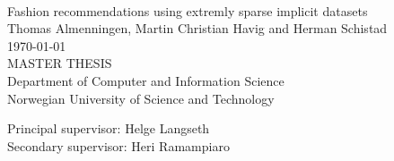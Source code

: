 \documentclass[10pt,a4paper,oneside]{report}
\def \thesistitle{Fashion recommendations using extremly sparse implicit datasets}
\def \authorname{Thomas Almenningen, Martin Christian Havig and Herman Schistad}
\def \supheri{Heri Ramampiaro}
\def \suphelge{Helge Langseth}
\begin{document}

\begin{titlepage}
\begin{center}
\mbox{}\\[6pc]
\begin{center}
\Huge{\thesistitle}\\[2pc]

\Large{\authorname}\\[1pc]
\large{\today}\\[2pc]

MASTER THESIS\\
Department of Computer and Information Science\\
Norwegian University of Science and Technology
\end{center}
\vfill

\noindent Principal supervisor: \suphelge \\
\noindent Secondary supervisor: \supheri

\end{center}
\end{titlepage}

\clearpage

\end{document}
